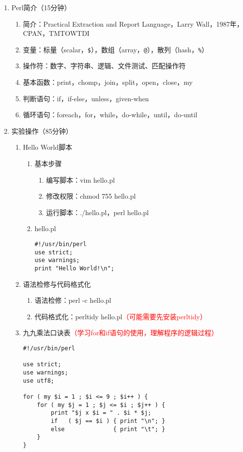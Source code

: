 \documentclass{TIJMUjiaoanSY}
\begin{document}
\firstTail

\newpage
\otherHeader

\begin{enumerate}
  \item Perl简介（15分钟）
    \begin{enumerate}
      \item 简介：Practical Extraction and Report Language，Larry Wall，1987年，CPAN，TMTOWTDI
      \item 变量：标量（scalar，\verb|$|），数组（array，\verb|@|），散列（hash，\verb|%|）
      \item 操作符：数字、字符串、逻辑、文件测试、匹配操作符
      \item 基本函数：print，chomp，join，split，open，close，my
      \item 判断语句：if，if-else，unless，given-when
      \item 循环语句：foreach，for，while，do-while，until，do-until
    \end{enumerate}
  \item 实验操作（85分钟）
    \begin{enumerate}
      \item Hello World脚本
\vspace*{-1em}
\begin{multicols}{2}
	\begin{enumerate}
	  \item 基本步骤
	    \begin{enumerate}
	      \item 编写脚本：vim hello.pl
	      \item 修改权限：chmod 755 hello.pl
	      \item 运行脚本：./hello.pl，perl hello.pl
	    \end{enumerate}
	  \item hello.pl
\begin{verbatim}
#!/usr/bin/perl
use strict;
use warnings;
print "Hello World!\n";
\end{verbatim}
	\end{enumerate}
\end{multicols}
\vspace*{-1em}
      \item 语法检修与代码格式化
	\begin{enumerate}
	  \item 语法检修：perl -c hello.pl
	  \item 代码格式化：perltidy hello.pl\textcolor{red}{（可能需要先安装perltidy）}
	\end{enumerate}
      \item 九九乘法口诀表\textcolor{red}{（学习for和if语句的使用，理解程序的逻辑过程）}
\begin{verbatim}
#!/usr/bin/perl

use strict;
use warnings;
use utf8;

for ( my $i = 1 ; $i <= 9 ; $i++ ) {
    for ( my $j = 1 ; $j <= $i ; $j++ ) {
        print "$j x $i = " . $i * $j;
        if   ( $j == $i ) { print "\n"; }
        else              { print "\t"; }
    }
}
\end{verbatim}
    \end{enumerate}
\end{enumerate}

\otherTail
\end{document}
